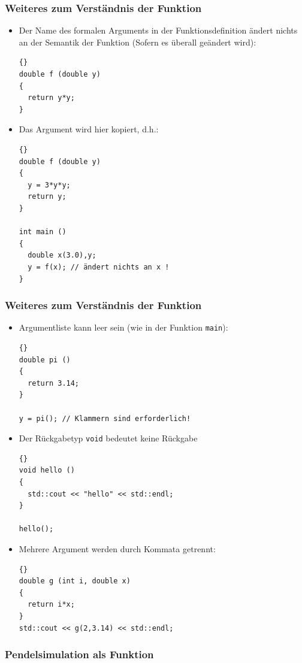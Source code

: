 \documentclass[ignorenonframetext,12pt]{beamer}
\theoremstyle{definition}
\theoremstyle{definition}
\begin{document}
\begin{frame}[fragile]
\frametitle{Weiteres zum Verständnis der Funktion}
\begin{itemize}
\item Der Name des formalen Arguments in der Funktionsdefinition
  ändert nichts an der Semantik der Funktion (Sofern es überall
  geändert wird):

{\scriptsize\begin{lstlisting}{}
double f (double y)
{
  return y*y;
}
\end{lstlisting}}

\item Das Argument wird hier kopiert, d.h.:
{\scriptsize\begin{lstlisting}{}
double f (double y)
{
  y = 3*y*y;
  return y;
}

int main ()
{
  double x(3.0),y;
  y = f(x); // ändert nichts an x !
}
\end{lstlisting}}
\end{itemize}
\end{frame}

\begin{frame}[fragile]
\frametitle{Weiteres zum Verständnis der Funktion}
\begin{itemize}
\item Argumentliste kann leer sein (wie in der Funktion
  \lstinline{main}):
{\scriptsize\begin{lstlisting}{}
double pi ()
{
  return 3.14;
}

y = pi(); // Klammern sind erforderlich!
\end{lstlisting}}

\item Der Rückgabetyp \lstinline{void} bedeutet \glqq{}keine
  Rückgabe\grqq{}

{\scriptsize\begin{lstlisting}{}
void hello ()
{
  std::cout << "hello" << std::endl;
}

hello();
\end{lstlisting}}
\item Mehrere Argument werden durch Kommata getrennt:

{\scriptsize\begin{lstlisting}{}
double g (int i, double x)
{
  return i*x;
}
std::cout << g(2,3.14) << std::endl;
\end{lstlisting}}
\end{itemize}
\end{frame}

\begin{frame}[fragile]
\frametitle{Pendelsimulation als Funktion}

\end{frame}
\end{document}
